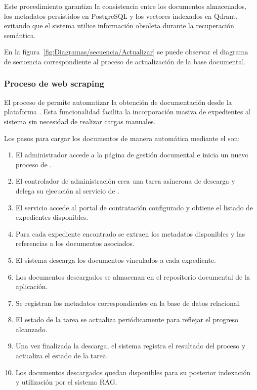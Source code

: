 Este procedimiento garantiza la consistencia entre los documentos almacenados, los metadatos persistidos en PostgreSQL y los vectores indexados en Qdrant, evitando que el sistema utilice información obsoleta durante la recuperación semántica.

En la figura~\ref{fig:Diagramas/secuencia/Actualizar} se puede observar el diagrama de secuencia correspondiente al proceso de actualización de la base documental.


\subsubsection{Proceso de web scraping}

El proceso de  permite automatizar la obtención de documentación desde la plataforma \contsec{}. Esta funcionalidad facilita la incorporación masiva de expedientes al sistema sin necesidad de realizar cargas manuales.

Los pasos para cargar los documentos de manera automática mediante el  son:
\begin{enumerate}
	\item El administrador accede a la página de gestión documental e inicia un nuevo proceso de .	
	\item El controlador de administración crea una tarea asíncrona de descarga y delega su ejecución al servicio de .
	\item El servicio accede al portal de contratación configurado y obtiene el listado de expedientes disponibles.
	\item Para cada expediente encontrado se extraen los metadatos disponibles y las referencias a los documentos asociados.
	\item El sistema descarga los documentos vinculados a cada expediente.
	\item Los documentos descargados se almacenan en el repositorio documental de la aplicación.
	\item Se registran los metadatos correspondientes en la base de datos relacional.
	\item El estado de la tarea se actualiza periódicamente para reflejar el progreso alcanzado.
	\item Una vez finalizada la descarga, el sistema registra el resultado del proceso y actualiza el estado de la tarea.
	\item Los documentos descargados quedan disponibles para su posterior indexación y utilización por el sistema RAG.
\end{enumerate}

